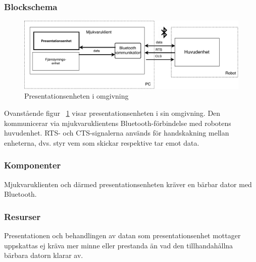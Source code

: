 \documentclass{article}
\begin{document}
\subsubsection{Blockschema}
\begin{figure}[H]
\includegraphics[scale=0.5]{Oversikt_presentationsenhet2}
\caption{Presentationsenheten i omgivning}
\label{fig:Oversikt_presentationsenhet2}
\end{figure}
Ovanstående figur ~\ref{fig:Oversikt_presentationsenhet2} visar presentationsenheten i sin omgivning. Den kommunicerar via mjukvaruklientens Bluetooth-förbindelse med robotens huvudenhet. RTS- och CTS-signalerna används för handskakning mellan enheterna, dvs. styr vem som skickar respektive tar emot data.  

\subsubsection{Komponenter}
Mjukvaruklienten och därmed presentationsenheten kräver en bärbar dator med Bluetooth. 

\subsubsection{Resurser}
Presentationen och behandlingen av datan som presentationsenhet mottager uppskattas ej kräva mer minne eller prestanda än vad den tillhandahållna bärbara datorn klarar av.
\end{document}
